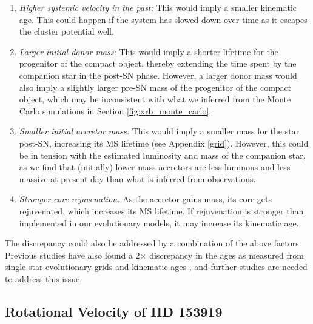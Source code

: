 \documentclass[linenumbers,trackchanges,twocolumn]{aastex701}
\begin{document}
\begin{enumerate}
    \item \textit{Higher systemic velocity in the past:} This would imply a smaller kinematic age. This could happen if the system has slowed down over time as it escapes the cluster potential well.
    \item \textit{Larger initial donor mass:} This would imply a shorter lifetime for the progenitor of the compact object, thereby extending the time spent by the companion star in the post-SN phase. However, a larger donor mass would also imply a slightly larger pre-SN mass of the progenitor of the compact object, which may be inconsistent with what we inferred from the Monte Carlo simulations in Section \ref{fig:xrb_monte_carlo}.
    \item \textit{Smaller initial accretor mass:} This would imply a smaller mass for the star post-SN, increasing its MS lifetime (see Appendix \ref{grid}). However, this could be in tension with the estimated luminosity and mass of the companion star, as we find that (initially) lower mass accretors are less luminous and less massive at present day than what is inferred from observations.
    \item \textit{Stronger core rejuvenation:} As the accretor gains mass, its core gets rejuvenated, which increases its MS lifetime. If rejuvenation is stronger than implemented in our evolutionary models, it may increase its kinematic age.
\end{enumerate}

The discrepancy could also be addressed by a combination of the above factors. Previous studies have also found a 2$\times$ discrepancy in the ages as measured from single star evolutionary grids and kinematic ages \citep[e.g.,][]{2018A&A...619A..78L}, and further studies are needed to address this issue.

\subsection{Rotational Velocity of HD 153919} \label{vrot}
\end{document}
